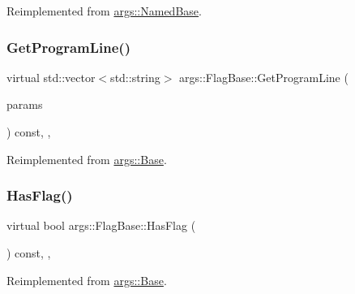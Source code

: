 Reimplemented from \hyperlink{classargs_1_1_named_base_a3c597a489d3ccc74937682407c08b3f7}{args\+::\+Named\+Base}.

\mbox{\label{classargs_1_1_flag_base_aeb3153e728d38f0f3e0ea5df46fb4acc}} 
\subsubsection{\texorpdfstring{Get\+Program\+Line()}{GetProgramLine()}}
{\footnotesize\ttfamily virtual std\+::vector$<$std\+::string$>$ args\+::\+Flag\+Base\+::\+Get\+Program\+Line (\begin{DoxyParamCaption}\item[{const \hyperlink{structargs_1_1_help_params}{Help\+Params} \&}]{params }\end{DoxyParamCaption}) const\hspace{0.3cm}{\ttfamily [inline]}, {\ttfamily [override]}, {\ttfamily [virtual]}}



Reimplemented from \hyperlink{classargs_1_1_base_a88fcbbc4bfe3b7af9fafe6e96a19f337}{args\+::\+Base}.

\mbox{\label{classargs_1_1_flag_base_a67b6fa7bfd7b3ed18caeb2a6381ed1a2}} 
\subsubsection{\texorpdfstring{Has\+Flag()}{HasFlag()}}
{\footnotesize\ttfamily virtual bool args\+::\+Flag\+Base\+::\+Has\+Flag (\begin{DoxyParamCaption}{ }\end{DoxyParamCaption}) const\hspace{0.3cm}{\ttfamily [inline]}, {\ttfamily [override]}, {\ttfamily [virtual]}}



Reimplemented from \hyperlink{classargs_1_1_base_a81684f399665c0372439c070af5de4a7}{args\+::\+Base}.

\mbox{\label{classargs_1_1_flag_base_a729ebb681d373f09875abb2e04f820f2}} 
